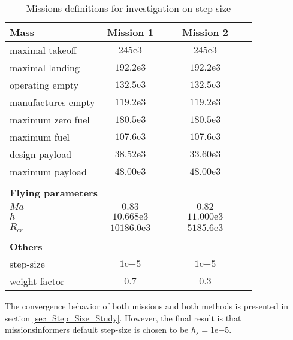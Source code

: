 \begin{table}[!h]
        \centering
        \begin{tabular}{l| c c c c c c }
            \textbf{Mass} & \multicolumn{1}{c}{\textbf{Mission 1}} &&& 
            \multicolumn{1}{c}{\textbf{Mission 2}}\\
            \hline
            maximal takeoff & $245 \mathrm{e}{3}$ &&&      $245\mathrm{e}{3}$         &&\\
            maximal landing & $192.2 \mathrm{e}{3}$ &&&      $192.2\mathrm{e}{3}$         &&\\
            operating empty & $132.5\mathrm{e}{3}$ &&&      $132.5\mathrm{e}{3} $         &&\\
            manufactures empty & $119.2\mathrm{e}{3} $ &&&      $119.2\mathrm{e}{3} $         &&\\
            maximum zero fuel  & $180.5\mathrm{e}{3} $ &&&      $180.5\mathrm{e}{3} $         &&\\
            maximum fuel & $107.6\mathrm{e}{3}$ &&&      $107.6\mathrm{e}{3}$         &&\\
            design payload & $38.52\mathrm{e}{3}$ &&&      $33.60\mathrm{e}{3} $         &&\\
            maximum payload & $48.00\mathrm{e}{3}$ &&&      $48.00\mathrm{e}{3}  $         &&\\
            \hline
            &  &&&               &&\\
            \textbf{Flying parameters} &  &&&               && \\
            \hline 
            $Ma$ & $0.83$ &&&      $0.82$         &&\\
            $h$ & $10.668\mathrm{e}{3}$ &&&      $11.000\mathrm{e}{3}  $         &&\\
            $R_{cr}$ & $10186.0\mathrm{e}{3} $ &&&      $5185.6\mathrm{e}{3} $         &&\\
            \hline
            &  &&&               &&\\
            \textbf{Others} &  &&&               && \\
            \hline 
            step-size & $1\mathrm{e}{-5} $&&&      $1\mathrm{e}{-5}$         &&\\
            weight-factor & $0.7$ &&&      $0.3$         &&\\
        \end{tabular}
        \caption{Missions definitions for investigation on step-size}
        \label{tab_5_Mission_Step_Size}
\end{table} 

\FloatBarrier
The convergence behavior of both missions and 
both methods is presented in section \ref{sec_Step_Size_Study}.
However, the final result is that missionsinformers
default step-size is chosen to be $h_s = 1 \mathrm{e}{-5}$.